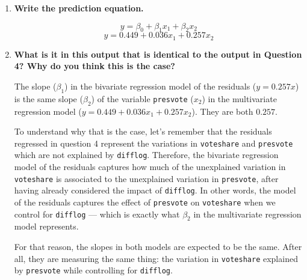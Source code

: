 \documentclass[12pt,letterpaper]{article}
\begin{document}
\begin{enumerate}
	\item \textbf{Write the prediction equation.}

		$$y = \beta_0 + \beta_1 x_1 + \beta_2 x_2$$
		$$y = 0.449 + 0.036x_1 + 0.257x_2$$

	\item \textbf{What is it in this output that is identical to the output in Question 4? Why do you think this is the case?}
	
		The slope ($\beta_1$) in the bivariate regression model of the residuals ($y=0.257x$) is the same slope ($\beta_2$) of the variable \texttt{presvote} ($x_2$) in the multivariate regression model ($y=0.449+0.036x_1+0.257x_2$). They are both $0.257$.
		
		To understand why that is the case, let's remember that the residuals regressed in question 4 represent the variations in \texttt{voteshare} and \texttt{presvote} which are not explained by \texttt{difflog}. Therefore, the bivariate regression model of the residuals captures how much of the unexplained variation in \texttt{voteshare} is associated to the unexplained variation in \texttt{presvote}, after having already considered the impact of \texttt{difflog}. In other words, the model of the residuals captures the effect of \texttt{presvote} on \texttt{voteshare} when we control for \texttt{difflog} --- which is exactly what $\beta_2$ in the multivariate regression model represents.
		
		For that reason, the slopes in both models are expected to be the same. After all, they are measuring the same thing: the variation in \texttt{voteshare} explained by \texttt{presvote} while controlling for \texttt{difflog}.

\end{enumerate}
\end{document}
